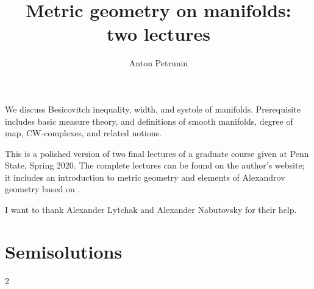 \documentclass[twoside]{book}
\begin{document}
 
\title{Metric geometry on manifolds:
\\ two lectures}
\author{Anton Petrunin}
\date{}
\maketitle

We discuss Besicovitch inequality, width, and systole of manifolds.
Prerequisite includes  
basic measure theory, and
definitions of smooth manifolds,
degree of map, 
CW-complexes,
and related notions.

This is a polished version of two final lectures of a graduate course given at Penn State, Spring 2020.
The complete lectures can be found on the author's website;
it includes an introduction to metric geometry \cite{petrunin2020pure}
and elements of Alexandrov geometry based on \cite{alexander-kapovitch-petrunin-2019}.

I want to thank Alexander Lytchak and Alexander Nabutovsky for their help.

\thispagestyle{empty}
\cleardoublepage
{}
{}
\tableofcontents
\thispagestyle{empty}

%



%
%
%
\backmatter

\chapter{Semisolutions}
{

\footnotesize
\begin{multicols}{2}


\end{multicols}
}


{\small\sloppy


\def\emph{\textit}

\printbibliography[heading=bibintoc]
\fussy
}
\end{document}
